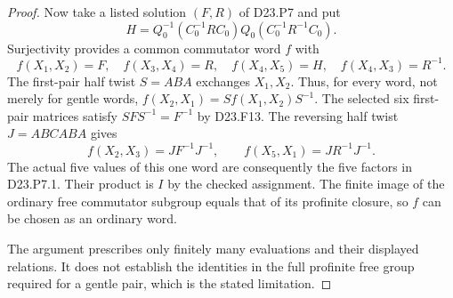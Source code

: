 \begin{proof}
Now take a listed solution $(F,R)$ of D23.P7 and put
\[
 H=Q_0^{-1}(C_0^{-1}RC_0)Q_0(C_0^{-1}R^{-1}C_0).
\]
Surjectivity provides a common commutator word $f$ with
\[
 f(X_1,X_2)=F,\quad f(X_3,X_4)=R,\quad
 f(X_4,X_5)=H,\quad f(X_4,X_3)=R^{-1}.
\]
The first-pair half twist $S=ABA$ exchanges $X_1,X_2$.
Thus, for every word, not merely for gentle words,
$f(X_2,X_1)=Sf(X_1,X_2)S^{-1}$. The selected six first-pair
matrices satisfy $SFS^{-1}=F^{-1}$ by D23.F13. The reversing
half twist $J=ABCABA$ gives
\[
 f(X_2,X_3)=JF^{-1}J^{-1},\qquad
 f(X_5,X_1)=JR^{-1}J^{-1}.
\]
The actual five values of this one word are consequently the
five factors in D23.P7.1. Their product is $I$ by the checked
assignment. The finite image of the ordinary free commutator
subgroup equals that of its profinite closure, so $f$ can be
chosen as an ordinary word.

The argument prescribes only finitely many evaluations and their
displayed relations. It does not establish the identities in
the full profinite free group required for a gentle pair, which
is the stated limitation.
\end{proof}
